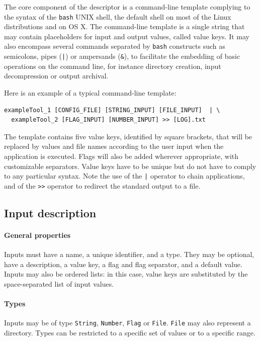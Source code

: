 \documentclass[a4paper,num-refs]{oup-contemporary}
\begin{document}
The core component of the descriptor is a command-line template
complying to the syntax of the \texttt{bash} UNIX shell, the default
shell on most of the Linux distributions and on OS X. The command-line
template is a single string that may contain placeholders for input and output values, called
value keys. It may also encompass several commands separated by
\texttt{bash} constructs such as semicolons, pipes (\texttt{|}) or
ampersands (\texttt{\&}), to facilitate the embedding of basic
operations on the command line, for instance directory creation, input
decompression or output archival.

Here is an example of a typical command-line template:
\begin{verbatim}
exampleTool_1 [CONFIG_FILE] [STRING_INPUT] [FILE_INPUT]  | \
  exampleTool_2 [FLAG_INPUT] [NUMBER_INPUT] >> [LOG].txt
\end{verbatim}
The template contains five value keys, identified by square brackets,
that will be replaced by values and file names according to the user
input when the application is executed. Flags will also be added
wherever appropriate, with customizable separators. Value keys have to
be unique but do not have to comply to any particular syntax. Note the
use of the \texttt{|} operator to chain applications, and of
the \texttt{>>} operator to redirect the standard output to a file.

\subsection{Input description}

\paragraph{General properties} Inputs must have a name, a unique
identifier, and a type. They may be optional, have a description, a
value key, a flag and flag separator, and a default value. Inputs may
also be ordered lists: in this case, value keys are substituted by the
space-separated list of input values.

\paragraph{Types} Inputs may be of type \texttt{String}, \texttt{Number},
\texttt{Flag} or \texttt{File}. \texttt{File} may also represent a directory.
Types can be restricted to a specific set of values or to a specific range.
\end{document}
